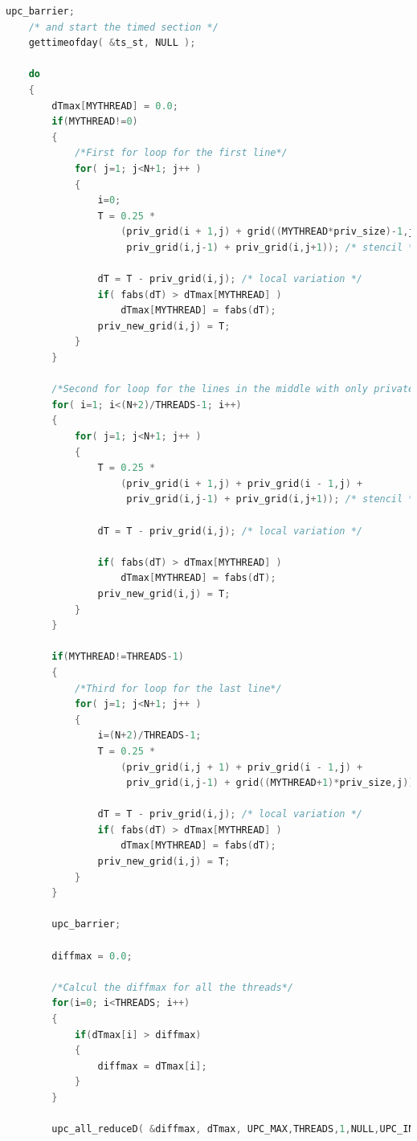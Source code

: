 \documentclass{report}
\begin{document}
\begin{lstlisting}[language=c]
    upc_barrier;
    /* and start the timed section */
    gettimeofday( &ts_st, NULL );

    do
    {
        dTmax[MYTHREAD] = 0.0;
        if(MYTHREAD!=0)
        {
            /*First for loop for the first line*/
            for( j=1; j<N+1; j++ )
            {  
                i=0;
                T = 0.25 *
                    (priv_grid(i + 1,j) + grid((MYTHREAD*priv_size)-1,j) +
                     priv_grid(i,j-1) + priv_grid(i,j+1)); /* stencil */

                dT = T - priv_grid(i,j); /* local variation */
                if( fabs(dT) > dTmax[MYTHREAD] )
                    dTmax[MYTHREAD] = fabs(dT);
                priv_new_grid(i,j) = T;
            }
        }
        
        /*Second for loop for the lines in the middle with only private pointers*/
        for( i=1; i<(N+2)/THREADS-1; i++)
        {
            for( j=1; j<N+1; j++ )
            {  
                T = 0.25 *
                    (priv_grid(i + 1,j) + priv_grid(i - 1,j) +
                     priv_grid(i,j-1) + priv_grid(i,j+1)); /* stencil */
                
                dT = T - priv_grid(i,j); /* local variation */

                if( fabs(dT) > dTmax[MYTHREAD] )
                    dTmax[MYTHREAD] = fabs(dT);
                priv_new_grid(i,j) = T;
            }
        }

        if(MYTHREAD!=THREADS-1)
        {
            /*Third for loop for the last line*/
            for( j=1; j<N+1; j++ )
            {  
                i=(N+2)/THREADS-1;
                T = 0.25 *
                    (priv_grid(i,j + 1) + priv_grid(i - 1,j) +
                     priv_grid(i,j-1) + grid((MYTHREAD+1)*priv_size,j)); /* stencil */

                dT = T - priv_grid(i,j); /* local variation */
                if( fabs(dT) > dTmax[MYTHREAD] )
                    dTmax[MYTHREAD] = fabs(dT);
                priv_new_grid(i,j) = T;
            }
        }

        upc_barrier;

        diffmax = 0.0;

        /*Calcul the diffmax for all the threads*/
        for(i=0; i<THREADS; i++)
        {
            if(dTmax[i] > diffmax)
            {
                diffmax = dTmax[i];
            }
        }

        upc_all_reduceD( &diffmax, dTmax, UPC_MAX,THREADS,1,NULL,UPC_IN_ALLSYNC | UPC_OUT_ALLSYNC);


\end{lstlisting}
\end{document}
